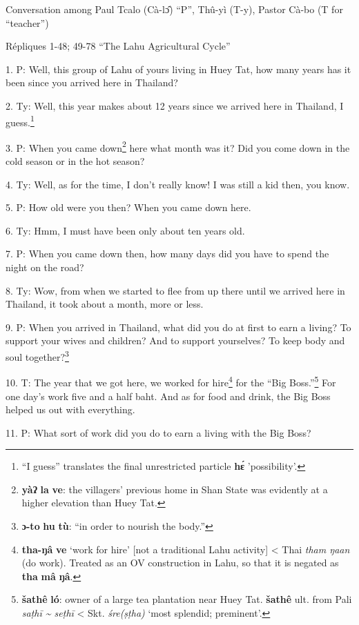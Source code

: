 \setcounter{footnote}{0}

Conversation among Paul Tcalo (Cà-lɔ̂) ``P'', Thû-yì (T-y), Pastor Cà-bo
(T for ``teacher'')

Répliques 1-48; 49-78 ``The Lahu Agricultural Cycle''

1. P: Well, this group of Lahu of yours living in Huey Tat, how many years has
it been since you arrived here in Thailand?

2. Ty: Well, this year makes about 12 years since we arrived here in Thailand,
I guess.\footnote{``I guess'' translates the final unrestricted particle \textbf{hɛ́} 'possibility'.}

3. P: When you came down\footnote{\textbf{yàʔ} \textbf{la} \textbf{ve}: the villagers' previous home in Shan State was evidently at a higher elevation than Huey Tat.} here what month was it? Did you come down in the cold
season or in the hot season?

4. Ty: Well, as for the time, I don't really know! I was still a kid then, you
know.

5. P: How old were you then? When you came down here.

6. Ty: Hmm, I must have been only about ten years old.

7. P: When you came down then, how many days did you have to spend the night on
the road?

8. Ty: Wow, from when we started to flee from up there until we arrived here in
Thailand, it took about a month, more or less.

9. P: When you arrived in Thailand, what did you do at first to earn a living?
To support your wives and children? And to support yourselves? To keep body and
soul together?\footnote{\textbf{ɔ-to} \textbf{hu} \textbf{tù}: ``in order to nourish the body.''}

10. T: The year that we got here, we worked for hire\footnote{\textbf{tha-ŋâ} \textbf{ve} `work for hire' [not a traditional Lahu activity] < Thai \textit{tham ŋaan} (do work). Treated as an OV construction in Lahu, so that it is negated as \textbf{tha} \textbf{mâ} \textbf{ŋâ}.} for the ``Big Boss.''\footnote{\textbf{šathê} \textbf{ló}: owner of a large tea plantation near Huey Tat. \textbf{šathê} ult. from Pali \textit{saṭhī \textasciitilde{} seṭhī} < Skt.\textit{ śre(ṣṭha)} `most splendid; preminent'.}
For one day's work five and a half baht. And as for food and drink, the Big Boss
helped us out with everything.

11. P: What sort of work did you do to earn a living with the Big Boss?

